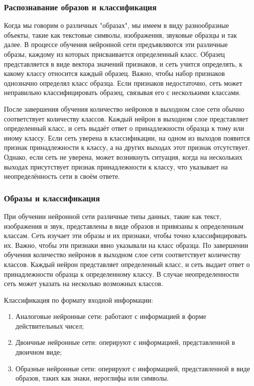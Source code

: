 \subsubsection{Распознавание образов и классификация}
Когда мы говорим о различных "образах", мы имеем в виду разнообразные объекты, такие как текстовые символы, изображения, звуковые образцы и так далее. В процессе обучения нейронной сети предъявляются эти различные образы, каждому из которых присваивается определенный класс. Образец представляется в виде вектора значений признаков, и сеть учится определять, к какому классу относится каждый образец. Важно, чтобы набор признаков однозначно определял класс образца. Если признаков недостаточно, сеть может неправильно классифицировать образец, связывая его с несколькими классами.

После завершения обучения количество нейронов в выходном слое сети обычно соответствует количеству классов. Каждый нейрон в выходном слое представляет определенный класс, и сеть выдаёт ответ о принадлежности образца к тому или иному классу. Если сеть уверена в классификации, на одном из выходов появится признак принадлежности к классу, а на других выходах этот признак отсутствует. Однако, если сеть не уверена, может возникнуть ситуация, когда на нескольких выходах присутствует признак принадлежности к классу, что указывает на неопределённость сети в своём ответе.

\subsubsection{Образы и классификация}
При обучении нейронной сети различные типы данных, такие как текст, изображения и звук, представлены в виде образов и привязаны к определенным классам. Сеть изучает эти образы и их признаки, чтобы точно классифицировать их. Важно, чтобы эти признаки явно указывали на класс образца. По завершении обучения количество нейронов в выходном слое сети соответствует количеству классов. Каждый нейрон представляет определенный класс, и сеть выдает ответ о принадлежности образца к определенному классу. В случае неопределенности сеть может указать на несколько возможных классов.

Классификация по формату входной информации:
\begin{enumerate}
\item Аналоговые нейронные сети: работают с информацией в форме действительных чисел;
\item Двоичные нейронные сети: оперируют с информацией, представленной в двоичном виде;
\item Образные нейронные сети: оперируют с информацией, представленной в виде образов, таких как знаки, иероглифы или символы.
\end{enumerate}

